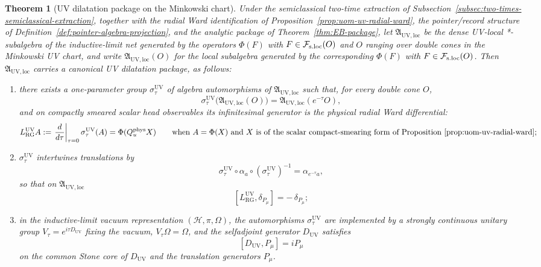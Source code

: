 \documentclass[10pt]{article}
\newcommand{\Fsloc}{\mathcal F_{\rm s.loc}}
\theoremstyle{definition}
\theoremstyle{plain}
\newtheorem{theorem}{Theorem}[section]
\begin{document}
\begin{theorem}[UV dilatation package on the Minkowski chart]
\label{thm:uom-uv-dilatation-package}
Under the semiclassical two-time extraction of
Subsection~\ref{subsec:two-times-semiclassical-extraction}, together
with the radial Ward identification of
Proposition~\ref{prop:uom-uv-radial-ward}, the pointer/record structure
of Definition~\ref{def:pointer-algebra-projection}, and the analytic
package of Theorem~\ref{thm:EB-package}, let
\(\mathfrak A_{\mathrm{UV,loc}}\) be the dense UV-local *-subalgebra of
the inductive-limit net generated by the operators \(\Phi(F)\) with
\(F\in\Fsloc(O)\) and \(O\) ranging over double cones in the Minkowski
UV chart, and write \(\mathfrak A_{\mathrm{UV,loc}}(O)\) for the local
subalgebra generated by the corresponding \(\Phi(F)\) with
\(F\in\Fsloc(O)\). Then \(\mathfrak A_{\mathrm{UV,loc}}\) carries a
canonical UV dilatation package, as follows:
\begin{enumerate}[label=\textnormal{(\roman*)},leftmargin=2.2em,itemsep=2pt]
\item there exists a one-parameter group \(\sigma_\tau^{\mathrm{UV}}\) of
algebra automorphisms of \(\mathfrak A_{\mathrm{UV,loc}}\) such that,
for every double cone \(O\),
\[
\sigma_\tau^{\mathrm{UV}}\big(\mathfrak A_{\mathrm{UV,loc}}(O)\big)
=\mathfrak A_{\mathrm{UV,loc}}(e^{-\tau}O),
\]
and on compactly smeared scalar head observables its infinitesimal
generator is the physical radial Ward differential:
\[
L_{\mathrm{RG}}^{\mathrm{UV}}A
:=
\left.\frac{d}{d\tau}\right|_{\tau=0}\sigma_\tau^{\mathrm{UV}}(A)
=\Phi(Q_u^{\mathrm{phys}}X)
\qquad
\text{when }A=\Phi(X)\text{ and }X\text{ is of the scalar compact-smearing form of Proposition~\ref{prop:uom-uv-radial-ward}};
\]
\item \(\sigma_\tau^{\mathrm{UV}}\) intertwines translations by
\[
\sigma_\tau^{\mathrm{UV}}\circ \alpha_a\circ
(\sigma_\tau^{\mathrm{UV}})^{-1}
=\alpha_{e^{-\tau}a},
\]
so that on \(\mathfrak A_{\mathrm{UV,loc}}\)
\begin{equation}
\label{eq:uom-uv-dilatation-derivation}
[L_{\mathrm{RG}}^{\mathrm{UV}},\delta_{P_\mu}]
=-\,\delta_{P_\mu};
\end{equation}
\item in the inductive-limit vacuum representation
\((\mathcal H,\pi,\Omega)\), the automorphisms
\(\sigma_\tau^{\mathrm{UV}}\) are implemented by a strongly continuous
unitary group \(V_\tau=e^{i\tau D_{\mathrm{UV}}}\) fixing the vacuum,
\(V_\tau\Omega=\Omega\), and the selfadjoint generator \(D_{\mathrm{UV}}\)
satisfies
\begin{equation}
\label{eq:uom-uv-dilatation-commutator}
[D_{\mathrm{UV}},P_\mu]=iP_\mu
\end{equation}
on the common Stone core of \(D_{\mathrm{UV}}\) and the translation
generators \(P_\mu\).
\end{enumerate}
\end{theorem}
\end{document}
